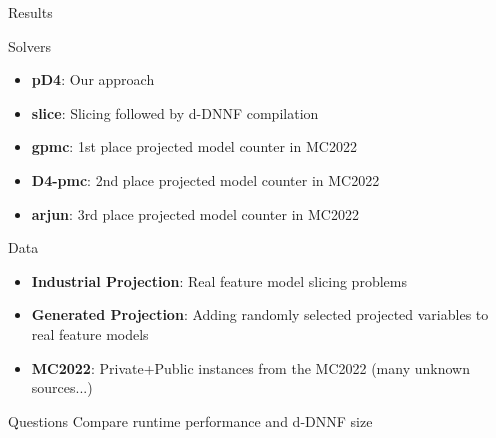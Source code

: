 \documentclass[
	aspectratio=169, %
	8pt, %
]{beamer}
\begin{document}
\begin{frame}{Results}
\begin{block}{Solvers}
    \begin{itemize}
        \item {\bf pD4}: Our approach
        \item {\bf slice}: Slicing followed by d-DNNF compilation
        \item {\bf gpmc}: 1st place projected model counter in MC2022
        \item {\bf D4-pmc}: 2nd place projected model counter in MC2022
        \item {\bf arjun}: 3rd place projected model counter in MC2022
    \end{itemize}
\end{block}
\begin{block}{Data}
    \begin{itemize}
        \item {\bf Industrial Projection}: Real feature model slicing problems
        \item {\bf Generated Projection}: Adding randomly selected projected variables to real feature models
        \item {\bf MC2022}: Private+Public instances from the MC2022 (many unknown sources...)
    \end{itemize}
\end{block}
\begin{block}{Questions}
    Compare runtime performance and d-DNNF size
\end{block}

\end{frame}
\end{document}
